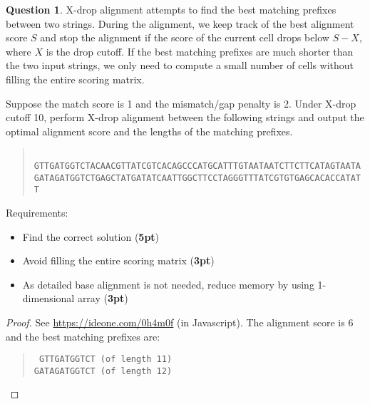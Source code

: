 \documentclass{article}[10pt]
\theoremstyle{definition}\newtheorem{question}{Question}
\begin{document}
\begin{question}
X-drop alignment attempts to find the best matching prefixes between two strings.
During the alignment, we keep track of the best alignment score $S$ and stop the alignment
if the score of the current cell drops below $S-X$, where $X$ is the drop cutoff.
If the best matching prefixes are much shorter than the two input strings,
we only need to compute a small number of cells without filling the entire scoring matrix.

Suppose the match score is 1 and the mismatch/gap penalty is 2.
Under X-drop cutoff 10, perform X-drop alignment between the following strings and
output the optimal alignment score and the lengths of the matching prefixes.
\begin{quote}
\footnotesize\tt
GTTGATGGTCTACAACGTTATCGTCACAGCCCATGCATTTGTAATAATCTTCTTCATAGTAATA\\
GATAGATGGTCTGAGCTATGATATCAATTGGCTTCCTAGGGTTTATCGTGTGAGCACACCATATT
\end{quote}
Requirements:
\begin{itemize}
\item Find the correct solution ({\bf 5pt})
\item Avoid filling the entire scoring matrix ({\bf 3pt})
\item As detailed base alignment is not needed, reduce memory by using 1-dimensional array ({\bf 3pt})
\end{itemize}
\end{question}

\begin{proof}
See \href{https://ideone.com/0h4m0f}{https://ideone.com/0h4m0f} (in Javascript).
The alignment score is 6 and the best matching prefixes are:
\begin{quote}
\footnotesize\tt
GTTGATGGTCT   (of length 11)\\
GATAGATGGTCT  (of length 12)
\end{quote}
\end{proof}
\end{document}
